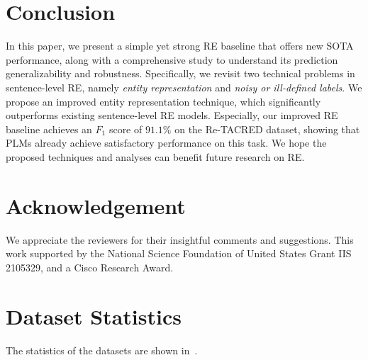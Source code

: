 \documentclass[11pt,a4paper]{article}
\begin{document}
\section{Conclusion}
In this paper, we present a simple yet strong RE baseline that offers new SOTA performance, along with a comprehensive study to understand its prediction generalizability and robustness.
Specifically, we revisit two technical problems in sentence-level RE, namely \emph{entity representation} and \emph{noisy or ill-defined labels}.
We propose an improved entity representation technique, which significantly outperforms existing sentence-level RE models.
Especially, our improved RE baseline achieves an $F_1$ score of $91.1\%$ on the Re-TACRED dataset, showing that PLMs already achieve satisfactory performance on this task.
We hope the proposed techniques and analyses can benefit future research on RE.




\section*{Acknowledgement}


We appreciate the reviewers for their insightful comments and suggestions.
This work supported by the National Science Foundation of United States Grant IIS 2105329, and a Cisco Research Award.






\clearpage
\appendix

\section{Dataset Statistics}
\label{ssec:data_statistics}
\begin{table}[!h]
    \centering
    \caption{Statistics of datasets.}
    \label{tab:data_statistics}
\end{table}
The statistics of the datasets are shown in~.
\end{document}
